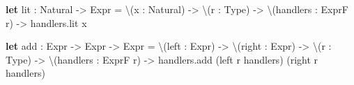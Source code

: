 \documentclass[]{article}
\newenvironment{Shaded}{}{}
\newcommand{\CommentTok}[1]{\textcolor[rgb]{0.38,0.63,0.69}{\textit{#1}}}
\newcommand{\KeywordTok}[1]{\textcolor[rgb]{0.00,0.44,0.13}{\textbf{#1}}}
\newcommand{\NormalTok}[1]{#1}
\newcommand{\OperatorTok}[1]{\textcolor[rgb]{0.40,0.40,0.40}{#1}}
\begin{document}
\begin{Shaded}
\begin{Highlighting}[]
\KeywordTok{let}\CommentTok{ }\NormalTok{lit}\CommentTok{ }\NormalTok{:}\CommentTok{ }\NormalTok{Natural}\CommentTok{ }\OperatorTok{{-}\textgreater{}}\CommentTok{ }\NormalTok{Expr}
\CommentTok{      }\NormalTok{=}\CommentTok{ }\OperatorTok{\textbackslash{}}\NormalTok{(x}\CommentTok{ }\NormalTok{:}\CommentTok{ }\NormalTok{Natural)}\CommentTok{ }\OperatorTok{{-}\textgreater{}}
\CommentTok{        }\OperatorTok{\textbackslash{}}\NormalTok{(r}\CommentTok{ }\NormalTok{:}\CommentTok{ }\NormalTok{Type)}\CommentTok{ }\OperatorTok{{-}\textgreater{}}
\CommentTok{        }\OperatorTok{\textbackslash{}}\NormalTok{(handlers}\CommentTok{ }\NormalTok{:}\CommentTok{ }\NormalTok{ExprF}\CommentTok{ }\NormalTok{r)}\CommentTok{ }\OperatorTok{{-}\textgreater{}}
\CommentTok{            }\NormalTok{handlers.lit}\CommentTok{ }\NormalTok{x}

\KeywordTok{let}\CommentTok{ }\NormalTok{add}\CommentTok{ }\NormalTok{:}\CommentTok{ }\NormalTok{Expr}\CommentTok{ }\OperatorTok{{-}\textgreater{}}\CommentTok{ }\NormalTok{Expr}\CommentTok{ }\OperatorTok{{-}\textgreater{}}\CommentTok{ }\NormalTok{Expr}
\CommentTok{      }\NormalTok{=}\CommentTok{ }\OperatorTok{\textbackslash{}}\NormalTok{(left}\CommentTok{ }\NormalTok{:}\CommentTok{ }\NormalTok{Expr)}\CommentTok{ }\OperatorTok{{-}\textgreater{}}
\CommentTok{        }\OperatorTok{\textbackslash{}}\NormalTok{(right}\CommentTok{ }\NormalTok{:}\CommentTok{ }\NormalTok{Expr)}\CommentTok{ }\OperatorTok{{-}\textgreater{}}
\CommentTok{        }\OperatorTok{\textbackslash{}}\NormalTok{(r}\CommentTok{ }\NormalTok{:}\CommentTok{ }\NormalTok{Type)}\CommentTok{ }\OperatorTok{{-}\textgreater{}}
\CommentTok{        }\OperatorTok{\textbackslash{}}\NormalTok{(handlers}\CommentTok{ }\NormalTok{:}\CommentTok{ }\NormalTok{ExprF}\CommentTok{ }\NormalTok{r)}\CommentTok{ }\OperatorTok{{-}\textgreater{}}
\CommentTok{            }\NormalTok{handlers.add}\CommentTok{ }\NormalTok{(left}\CommentTok{ }\NormalTok{r}\CommentTok{ }\NormalTok{handlers)}\CommentTok{ }\NormalTok{(right}\CommentTok{ }\NormalTok{r}\CommentTok{ }\NormalTok{handlers)}


\end{Highlighting}
\end{Shaded}
\end{document}

